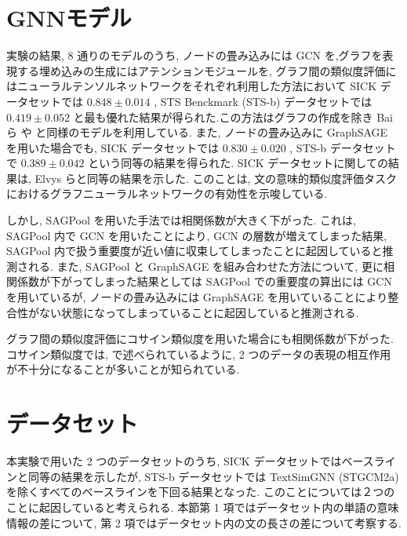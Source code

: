 \documentclass[a4j,twoside,12pt]{thesis} %
\begin{document}
\section{GNNモデル}
実験の結果, 8 通りのモデルのうち, ノードの畳み込みには GCN\cite{kipf2017semi} を,グラフを表現する埋め込みの生成にはアテンションモジュール\cite{bai2019simgnn}を, グラフ間の類似度評価にはニューラルテンソルネットワーク\cite{socher2013reasoning}をそれぞれ利用した方法において SICK データセットでは $0.848 \pm 0.014$ , STS Benckmark (STS-b) \cite{cer-etal-2017-semeval} データセットでは $0.419 \pm 0.052$ と最も優れた結果が得られた.この方法はグラフの作成を除き Bai ら\cite{bai2019simgnn} や \cite{zhou2020sentence} と同様のモデルを利用している. また, ノードの畳み込みに GraphSAGE \cite{hamilton2017inductive} を用いた場合でも, SICK データセットでは $0.830 \pm 0.020$ , STS-b データセットで $0.389 \pm 0.042$ という同等の結果を得られた. SICK データセットに関しての結果は, Elvys ら\cite{elvys2018predicting}と同等の結果を示した. このことは, 文の意味的類似度評価タスクにおけるグラフニューラルネットワークの有効性を示唆している.
\par しかし, SAGPool を用いた手法では相関係数が大きく下がった. これは, SAGPool 内で GCN を用いたことにより, GCN の層数が増えてしまった結果, SAGPool 内で扱う重要度が近い値に収束してしまったことに起因していると推測される. また, SAGPool と GraphSAGE を組み合わせた方法について, 更に相関係数が下がってしまった結果としては SAGPool での重要度の算出には GCN を用いているが, ノードの畳み込みには GraphSAGE を用いていることにより整合性がない状態になってしまっていることに起因していると推測される.
\par グラフ間の類似度評価にコサイン類似度を用いた場合にも相関係数が下がった.コサイン類似度では, \cite{socher2013reasoning} で述べられているように,  2 つのデータの表現の相互作用が不十分になることが多いことが知られている.

\section{データセット}
本実験で用いた 2 つのデータセットのうち, SICK データセットではベースラインと同等の結果を示したが, STS-b データセットでは TextSimGNN (STGCM2a) を除くすべてのベースラインを下回る結果となった.
このことについては２つのことに起因していると考えられる. 本節第 1 項ではデータセット内の単語の意味情報の差について, 第 2 項ではデータセット内の文の長さの差について考察する.
\end{document}

